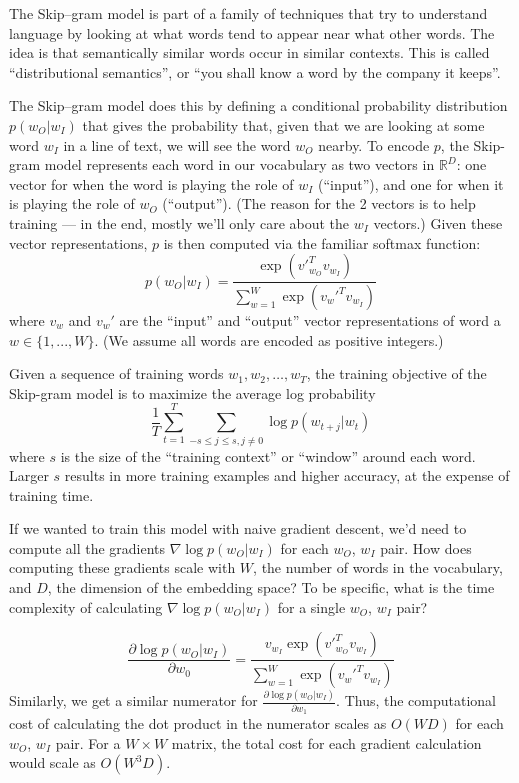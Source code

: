 The Skip--gram model is part of a family of techniques that try to understand language by looking at what words tend to appear near what other words.  The idea is that semantically similar words occur in similar contexts.  This is called ``distributional semantics'', or ``you shall know a word by the company it keeps''.  

The Skip--gram model does this by defining a conditional probability distribution $p(w_O|w_I)$ that gives the probability that, given that we are looking at some word $w_I$ in a line of text, we will see the word $w_O$ nearby.  To encode $p$, the Skip-gram model represents each word in our vocabulary as two vectors in $\mathbb{R}^D$: one vector for when the word is playing the role of $w_I$ (``input''), and one for when it is playing the role of $w_O$ (``output'').  (The reason for the 2 vectors is to help training --- in the end, mostly we'll only care about the $w_I$ vectors.)  Given these vector representations, $p$ is then computed via the familiar softmax function:
\[ p(w_O|w_I) = \frac{\exp \left({v'}_{w_O}^T v_{w_I} \right)}{\sum_{w=1}^W \exp \left( {v_w'}^T v_{w_I} \right)} \tag{2} \label{eqn:softmax} \]
where $v_w$ and $v_w'$ are the ``input'' and ``output'' vector representations of word a $w \in \{1, ..., W\}$.  (We assume all words are encoded as positive integers.)

Given a sequence of training words $w_1, w_2, \hdots, w_T$, the training objective of the Skip-gram model is to maximize the average log probability
\[ \frac{1}{T}  \sum_{t=1}^T \sum_{-s \leq j \leq s, j \neq 0} \log p(w_{t+j}|w_t) \tag{1}\label{eqn:opt} \] where $s$ is the size of the ``training context'' or ``window'' around each word. Larger $s$ results in more training examples and higher accuracy, at the expense of training time.

\problem[5]
If we wanted to train this model with naive gradient descent, we'd need to compute all the gradients $\nabla \log p(w_O|w_I)$ for each $w_O$, $w_I$ pair.  How does computing these gradients scale with $W$, the number of words in the vocabulary, and $D$, the dimension of the embedding space? To be specific, what is the time complexity of calculating $\nabla \log p(w_O|w_I)$ for a single $w_O$, $w_I$ pair?

\begin{solution}
	\begin{equation}
		\frac{\partial \log p(w_O|w_I)}{\partial w_0} = \frac{v_{w_I}\exp \left({v'}_{w_O}^T v_{w_I} \right)}{\sum _{w=1}^W\exp \left ({v_w'}^T v_{w_I} \right)}
	\end{equation}
	Similarly, we get a similar numerator for $\frac{\partial \log p(w_O|w_I)}{\partial w_1}$. Thus, the computational cost of calculating the dot product in the numerator scales as $O(WD)$ for each $w_O$, $w_I$ pair. For a $W \times W$ matrix, the total cost for each gradient calculation would scale as $O(W^3D)$.
\end{solution}



